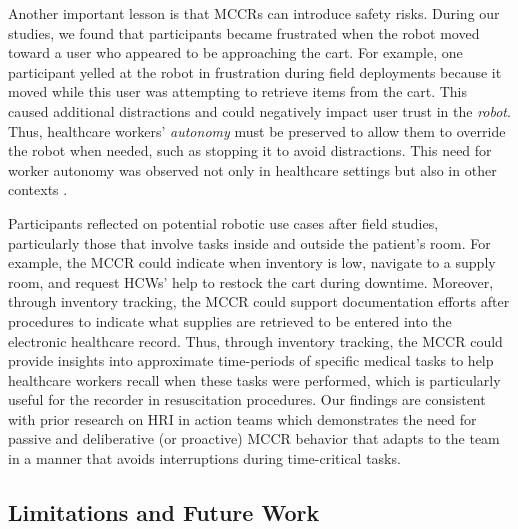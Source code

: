 Another important lesson %
is that MCCRs can introduce safety risks. 
During our studies, we found that participants became frustrated when the robot moved toward a user who appeared to be approaching the cart. 
For example, one participant yelled at the robot in frustration during field deployments because it moved while this user was attempting to retrieve items from the cart. 
This caused additional distractions and could negatively impact user trust in the \textit{robot}. 
Thus, healthcare workers' \textit{autonomy} must be preserved to allow them to override the robot when needed, such as stopping it to avoid distractions. This need for worker autonomy was observed not only in healthcare settings \cite{taylor2024towards} but also in other contexts \cite{lee2024contrasting}.

Participants reflected on potential robotic use cases after field studies, particularly those that involve tasks inside and outside the patient's room. 
For example, the MCCR could indicate when inventory is low, navigate to a supply room, and request HCWs' help to restock the cart during downtime. 
Moreover, through inventory tracking, the MCCR could support documentation efforts after procedures to indicate what supplies are retrieved to be entered into the electronic healthcare record. 
Thus, through inventory tracking, the MCCR could provide insights into approximate time-periods of specific medical tasks to help healthcare workers recall when these tasks were performed, which is particularly useful for the recorder in resuscitation procedures. 
Our findings are consistent with prior research on HRI in action teams which demonstrates the need for passive and deliberative (or proactive) MCCR behavior \cite{jamshad2024taking} that adapts to the team in a manner that avoids interruptions during time-critical tasks.

\subsection{Limitations and Future Work}

